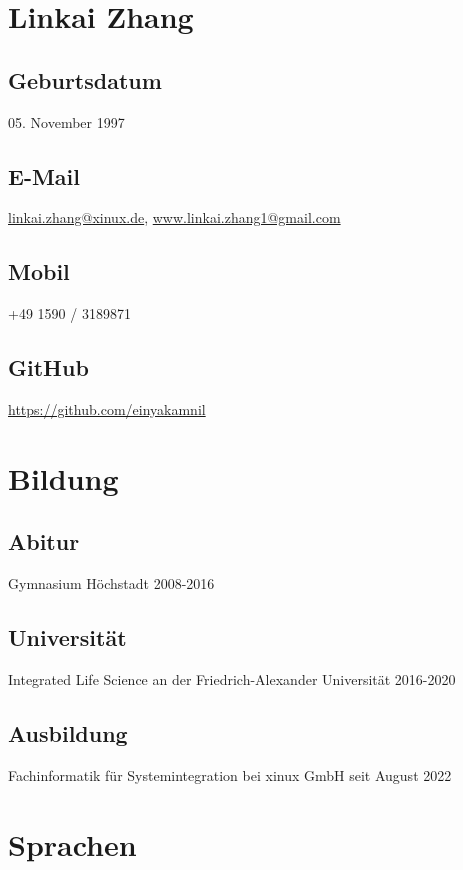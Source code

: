 \documentclass{article}
\begin{document}
\author{Linkai Zhang}

\section{Linkai Zhang}

\subsection{Geburtsdatum}
05. November 1997

\subsection{E-Mail}
\href{linkai.zhang@xinux.de}{linkai.zhang@xinux.de},
\href{www.linkai.zhang1@gmail.com}{www.linkai.zhang1@gmail.com}

\subsection{Mobil}
+49 1590 / 3189871

\subsection{GitHub}
\href{https://github.com/einyakamnil}{https://github.com/einyakamnil}

\section{Bildung}

\subsection{Abitur}
Gymnasium Höchstadt 2008-2016

\subsection{Universität}
Integrated Life Science an der Friedrich-Alexander Universität 2016-2020

\subsection{Ausbildung}
Fachinformatik für Systemintegration bei xinux GmbH seit August 2022

\section{Sprachen}
\end{document}
